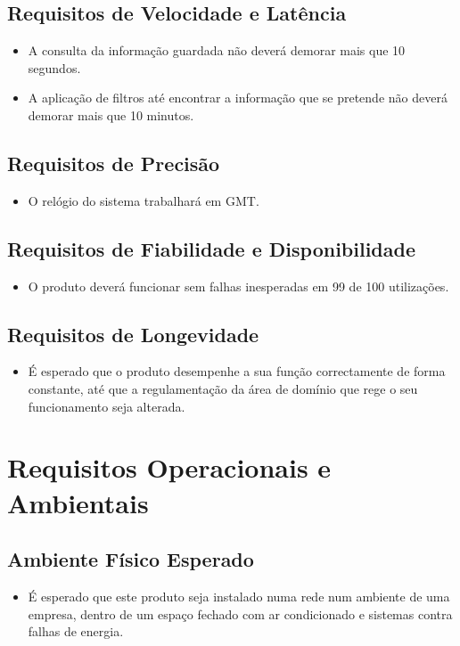 \subsection{Requisitos de Velocidade e Latência}
\begin{itemize}
\item A consulta da informação guardada não deverá demorar mais que 10 segundos.
\item A aplicação de filtros até encontrar a informação que se pretende não deverá demorar mais que 10 minutos.
\end{itemize}

\subsection{Requisitos de Precisão}
\begin{itemize}
\item O relógio do sistema trabalhará em GMT.
\end{itemize}

\subsection{Requisitos de Fiabilidade e Disponibilidade}
\begin{itemize}
\item O produto deverá funcionar sem falhas inesperadas em 99 de 100 utilizações.
\end{itemize}

\subsection{Requisitos de Longevidade}
\begin{itemize}
\item É esperado que o produto desempenhe a sua função correctamente de forma constante, até que a regulamentação da área de domínio que rege o seu funcionamento seja alterada.
\end{itemize}

\section{Requisitos Operacionais e Ambientais}
\subsection{Ambiente Físico Esperado}
\begin{itemize}
\item É esperado que este produto seja instalado numa rede num ambiente de uma empresa, dentro de um espaço fechado com ar condicionado e sistemas contra falhas de energia.
\end{itemize}


